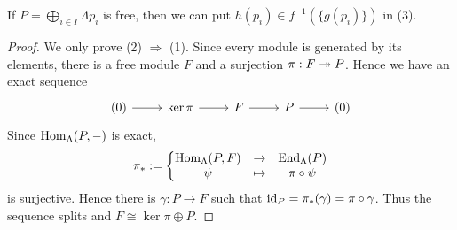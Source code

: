 
\begin{remark}
If $P=\bigoplus_{i\in I}\Lambda p_i$ is free, then we can put $h(p_i)\in f^{-1}(\{g(p_i)\})$ in (3).
\end{remark}


\begin{proof}
We only prove (2) $\Rightarrow$ (1). Since every module is generated by its elements, there is a free module $F$ and a surjection $\pi:F\twoheadrightarrow P$. Hence we have an exact sequence
\[
\begin{tikzcd}
	(0) \ar[r] & \ker \pi \ar[r] & F \ar[r] & P \ar[r] & (0)
\end{tikzcd}
\]
Since $\operatorname{Hom}_\Lambda(P,-)$ is exact,
\[
\pi_* :=
\left\{
\begin{matrix}
\operatorname{Hom}_\Lambda(P,F) & \to & \operatorname{End}_{\Lambda}(P) \\
\psi & \mapsto & \pi \circ \psi
\end{matrix}
\right.
\]
is surjective. Hence there is $\gamma:P\to F$ such that $\operatorname{id}_P=\pi_*(\gamma)=\pi\circ \gamma$. Thus the sequence splits and $F\cong \ker\pi \oplus P$.
\end{proof}

